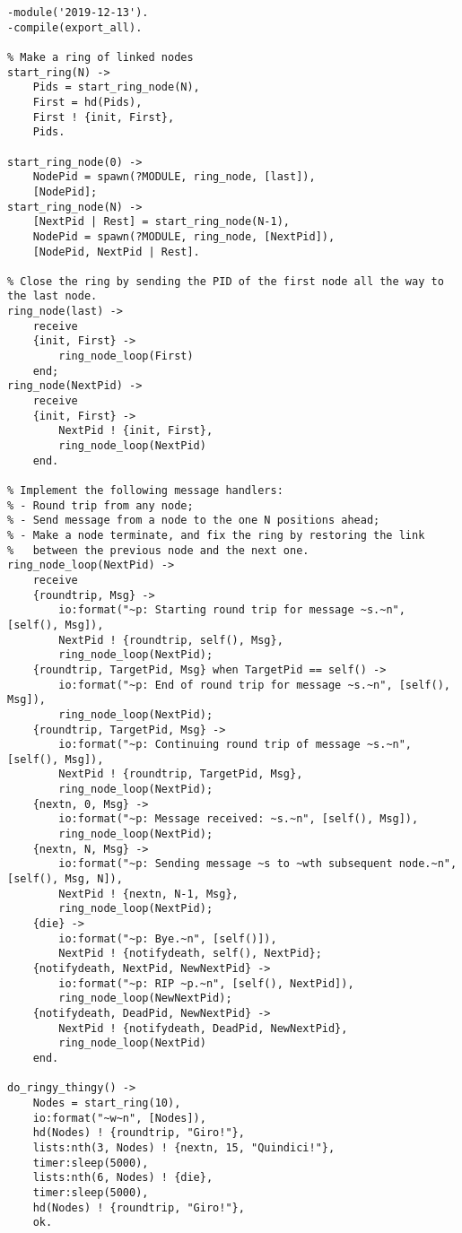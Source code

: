 \begin{lstlisting}
-module('2019-12-13').
-compile(export_all).

% Make a ring of linked nodes
start_ring(N) ->
    Pids = start_ring_node(N),
    First = hd(Pids),
    First ! {init, First},
    Pids.

start_ring_node(0) ->
    NodePid = spawn(?MODULE, ring_node, [last]),
    [NodePid];
start_ring_node(N) ->
    [NextPid | Rest] = start_ring_node(N-1),
    NodePid = spawn(?MODULE, ring_node, [NextPid]),
    [NodePid, NextPid | Rest].

% Close the ring by sending the PID of the first node all the way to the last node.
ring_node(last) ->
    receive
    {init, First} ->
        ring_node_loop(First)
    end;
ring_node(NextPid) ->
    receive
    {init, First} ->
        NextPid ! {init, First},
        ring_node_loop(NextPid)
    end.

% Implement the following message handlers:
% - Round trip from any node;
% - Send message from a node to the one N positions ahead;
% - Make a node terminate, and fix the ring by restoring the link
%   between the previous node and the next one.
ring_node_loop(NextPid) ->
    receive
    {roundtrip, Msg} ->
        io:format("~p: Starting round trip for message ~s.~n", [self(), Msg]),
        NextPid ! {roundtrip, self(), Msg},
        ring_node_loop(NextPid);
    {roundtrip, TargetPid, Msg} when TargetPid == self() ->
        io:format("~p: End of round trip for message ~s.~n", [self(), Msg]),
        ring_node_loop(NextPid);
    {roundtrip, TargetPid, Msg} ->
        io:format("~p: Continuing round trip of message ~s.~n", [self(), Msg]),
        NextPid ! {roundtrip, TargetPid, Msg},
        ring_node_loop(NextPid);
    {nextn, 0, Msg} ->
        io:format("~p: Message received: ~s.~n", [self(), Msg]),
        ring_node_loop(NextPid);
    {nextn, N, Msg} ->
        io:format("~p: Sending message ~s to ~wth subsequent node.~n", [self(), Msg, N]),
        NextPid ! {nextn, N-1, Msg},
        ring_node_loop(NextPid);
    {die} ->
        io:format("~p: Bye.~n", [self()]),
        NextPid ! {notifydeath, self(), NextPid};
    {notifydeath, NextPid, NewNextPid} ->
        io:format("~p: RIP ~p.~n", [self(), NextPid]),
        ring_node_loop(NewNextPid);
    {notifydeath, DeadPid, NewNextPid} ->
        NextPid ! {notifydeath, DeadPid, NewNextPid},
        ring_node_loop(NextPid)
    end.

do_ringy_thingy() ->
    Nodes = start_ring(10),
    io:format("~w~n", [Nodes]),
    hd(Nodes) ! {roundtrip, "Giro!"},
    lists:nth(3, Nodes) ! {nextn, 15, "Quindici!"},
    timer:sleep(5000),
    lists:nth(6, Nodes) ! {die},
    timer:sleep(5000),
    hd(Nodes) ! {roundtrip, "Giro!"},
    ok.



\end{lstlisting}
